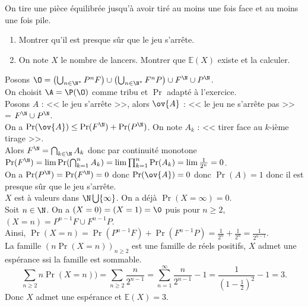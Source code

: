 \documentclass[11pt]{article}
\renewcommand*{\E}{\mathbb{E}}
\begin{document}
\begin{exercice}{}{}
    On tire une pièce équilibrée jusqu'à avoir tiré au moins une fois face et au moins une fois pile.
    \begin{enumerate}
        \item Montrer qu'il est presque sûr que le jeu s'arrête.
        \item On note $X$ le nombre de lancers. Montrer que $\E(X)$ existe et la calculer.
    \end{enumerate}
    \tcblower
    Posons $\O=\left(\bigcup_{n\in\N^*}P^n F\right) \cup \left( \bigcup_{n\in\N^*}F^nP \right)\cup F^\N \cup P^\N$.\\
    On choisit $\A=\P(\O)$ comme tribu et $\Pr$ adapté à l'exercice.\\
     Posons $A$ : << le jeu s'arrête >>, alors $\ov{A}$ : << le jeu ne s'arrête pas >> = $F^\N \cup P^\N$.\\
    On a $\Pr(\ov{A})\leq \Pr(F^\N)+\Pr(P^\N)$. On note $A_k$ : << tirer face au $k$-ième tirage >>.\\
    Alors $F^\N = \bigcap_{k\in\N}A_k$ donc par continuité monotone $\Pr(F^\N)=\lim \Pr(\bigcap_{k=1}^n A_k)=\lim\prod_{k=1}^n\Pr(A_k)=\lim\frac{1}{2^n}=0$.\\
    On a $\Pr(P^\N)=\Pr(F^\N)=0$ donc $\Pr(\ov{A})=0$ donc $\Pr(A)=1$ donc il est presque sûr que le jeu s'arrête.\\
     $X$ est à valeurs dans $\N\bigcup\{\infty\}$. On a déjà $\Pr(X=\infty)=0$.\\
    Soit $n\in\N$. On a $(X=0)=(X=1)=\0$ puis pour $n\geq2$, $(X=n)=P^{n-1}F\cup F^{n-1}P$.\\
    Ainsi, $\Pr(X=n)=\Pr(P^{n-1}F)+\Pr(F^{n-1}P)=\frac{1}{2^n} + \frac{1}{2^n} = \frac{1}{2^{n-1}}$.\\
    La famille $(n\Pr(X=n))_{n\geq2}$ est une famille de réels positifs, $X$ admet une espérance ssi la famille est sommable.
    \begin{equation*}
        \sum_{n\geq 2}n\Pr(X=n))=\sum_{n\geq2}\frac{n}{2^{n-1}} = \sum_{n=1}^{\infty}\frac{n}{2^{n-1}} - 1 = \frac{1}{(1-\frac{1}{2})^2} - 1 = 3.
    \end{equation*}
    Donc $X$ admet une espérance et $\E(X)=3$.
\end{exercice}
\end{document}
